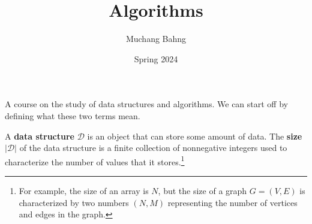 \documentclass{article}
\begin{document}
\title{Algorithms}
\author{Muchang Bahng}
\date{Spring 2024}

\maketitle
\tableofcontents
\pagebreak

  A course on the study of data structures and algorithms. We can start off by defining what these two terms mean. 

  \begin{definition}
    A \textbf{data structure} $\mathcal{D}$ is an object that can store some amount of data. The \textbf{size} $|\mathcal{D}|$ of the data structure is a finite collection of nonnegative integers used to characterize the number of values that it stores.\footnote{For example, the size of an array is $N$, but the size of a graph $G = (V, E)$ is characterized by two numbers $(N, M)$ representing the number of vertices and edges in the graph.} 
  \end{definition}
\end{document}
